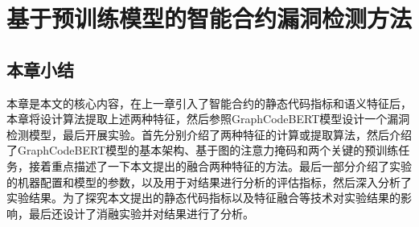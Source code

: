 \chapter{基于预训练模型的智能合约漏洞检测方法}




\section{本章小结}
\label{sec:本章小结4}
本章是本文的核心内容，在上一章引入了智能合约的静态代码指标和语义特征后，本章将设计算法提取上述两种特征，然后参照GraphCodeBERT模型设计一个漏洞检测模型，最后开展实验。首先分别介绍了两种特征的计算或提取算法，然后介绍了GraphCodeBERT模型的基本架构、基于图的注意力掩码和两个关键的预训练任务，接着重点描述了一下本文提出的融合两种特征的方法。最后一部分介绍了实验的机器配置和模型的参数，以及用于对结果进行分析的评估指标，然后深入分析了实验结果。为了探究本文提出的静态代码指标以及特征融合等技术对实验结果的影响，最后还设计了消融实验并对结果进行了分析。

